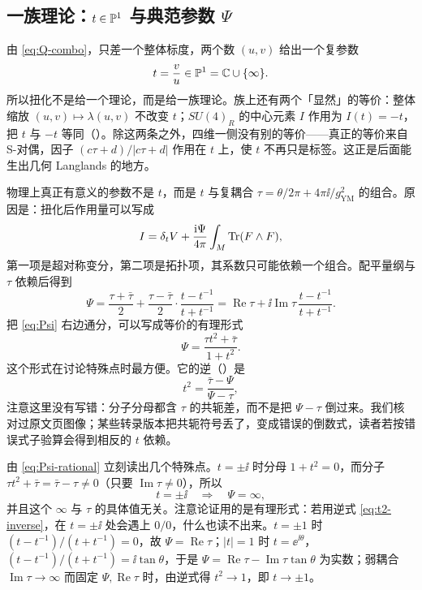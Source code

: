 \subsection{一族理论：$t\in\mathbb{P}^1$ 与典范参数 $\Psi$}

由 \eqref{eq:Q-combo}，只差一个整体标度，两个数 $(u,v)$ 给出一个复参数
\begin{equation}
t=\frac{v}{u}\in\mathbb{P}^1=\mathbb{C}\cup\{\infty\}.
\label{eq:t-param}
\end{equation}
所以扭化不是给一个理论，而是给一族理论。族上还有两个「显然」的等价：整体缩放 $(u,v)\mapsto\lambda(u,v)$ 不改变 $t$；$SU(4)_R$ 的中心元素 $I$ 作用为 $I(t)=-t$，把 $t$ 与 $-t$ 等同（）。除这两条之外，四维一侧没有别的等价——真正的等价来自 S-对偶，因子 $(c\tau+d)/|c\tau+d|$ 作用在 $t$ 上，使 $t$ 不再只是标签。这正是后面能生出几何 Langlands 的地方。

物理上真正有意义的参数不是 $t$，而是 $t$ 与复耦合 $\tau=\theta/2\pi+4\pi\ii/g_{\mathrm{YM}}^2$ 的组合。原因是：扭化后作用量可以写成
\begin{equation}
I=\delta_t V+\frac{\mathrm{i}\Psi}{4\pi}\int_M\operatorname{Tr}(F\wedge F),
\label{eq:action-Psi}
\end{equation}
第一项是超对称变分，第二项是拓扑项，其系数只可能依赖一个组合。配平量纲与 $\tau$ 依赖后得到
\begin{equation}
\Psi=\frac{\tau+\bar\tau}{2}+\frac{\tau-\bar\tau}{2}\cdot\frac{t-t^{-1}}{t+t^{-1}}
=\operatorname{Re}\tau+\ii\operatorname{Im}\tau\,\frac{t-t^{-1}}{t+t^{-1}}.
\label{eq:Psi}
\end{equation}
 把 \eqref{eq:Psi} 右边通分，可以写成等价的有理形式
\begin{equation}
\Psi=\frac{\tau t^2+\bar\tau}{1+t^2}.
\label{eq:Psi-rational}
\end{equation}
这个形式在讨论特殊点时最方便。它的逆（）是
\begin{equation}
t^2=\frac{\bar\tau-\Psi}{\Psi-\tau},
\label{eq:t2-inverse}
\end{equation}
注意这里没有写错：分子分母都含 $\tau$ 的共轭差，而不是把 $\Psi-\tau$ 倒过来。我们核对过原文页图像；某些转录版本把共轭符号丢了，变成错误的倒数式，读者若按错误式子验算会得到相反的 $t$ 依赖。

由 \eqref{eq:Psi-rational} 立刻读出几个特殊点。$t=\pm\ii$ 时分母 $1+t^2=0$，而分子 $\tau t^2+\bar\tau=\bar\tau-\tau\neq0$（只要 $\operatorname{Im}\tau\neq0$），所以
\begin{equation}
t=\pm\ii\quad\Longrightarrow\quad \Psi=\infty,
\label{eq:Psi-inf}
\end{equation}
并且这个 $\infty$ 与 $\tau$ 的具体值无关。注意论证用的是有理形式：若用逆式 \eqref{eq:t2-inverse}，在 $t=\pm\ii$ 处会遇上 $0/0$，什么也读不出来。$t=\pm1$ 时 $(t-t^{-1})/(t+t^{-1})=0$，故 $\Psi=\operatorname{Re}\tau$；$|t|=1$ 时 $t=\ee^{\ii\theta}$，$(t-t^{-1})/(t+t^{-1})=\ii\tan\theta$，于是 $\Psi=\operatorname{Re}\tau-\operatorname{Im}\tau\tan\theta$ 为实数；弱耦合 $\operatorname{Im}\tau\to\infty$ 而固定 $\Psi,\operatorname{Re}\tau$ 时，由逆式得 $t^2\to1$，即 $t\to\pm1$。

